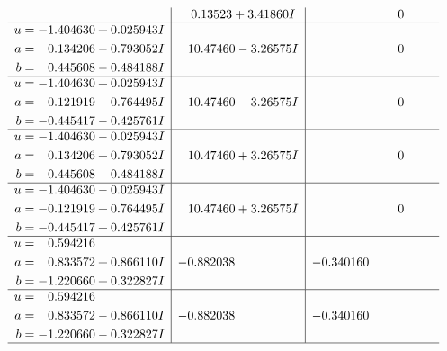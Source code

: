 \documentclass[1p]{elsarticle_modified}
\theoremstyle{definition}
\begin{document}
$$\begin{array}{c|c|c}
 & \phantom{-}0.13523 + 3.41860 I & \phantom{-0.000000 } 0 \\ \hline\begin{aligned}
u &= -1.404630 + 0.025943 I \\
a &= \phantom{-}0.134206 - 0.793052 I \\
b &= \phantom{-}0.445608 - 0.484188 I\end{aligned}
 & \phantom{-}10.47460 - 3.26575 I & \phantom{-0.000000 } 0 \\ \hline\begin{aligned}
u &= -1.404630 + 0.025943 I \\
a &= -0.121919 - 0.764495 I \\
b &= -0.445417 - 0.425761 I\end{aligned}
 & \phantom{-}10.47460 - 3.26575 I & \phantom{-0.000000 } 0 \\ \hline\begin{aligned}
u &= -1.404630 - 0.025943 I \\
a &= \phantom{-}0.134206 + 0.793052 I \\
b &= \phantom{-}0.445608 + 0.484188 I\end{aligned}
 & \phantom{-}10.47460 + 3.26575 I & \phantom{-0.000000 } 0 \\ \hline\begin{aligned}
u &= -1.404630 - 0.025943 I \\
a &= -0.121919 + 0.764495 I \\
b &= -0.445417 + 0.425761 I\end{aligned}
 & \phantom{-}10.47460 + 3.26575 I & \phantom{-0.000000 } 0 \\ \hline\begin{aligned}
u &= \phantom{-}0.594216\phantom{ +0.000000I} \\
a &= \phantom{-}0.833572 + 0.866110 I \\
b &= -1.220660 + 0.322827 I\end{aligned}
 & -0.882038\phantom{ +0.000000I} & -0.340160\phantom{ +0.000000I} \\ \hline\begin{aligned}
u &= \phantom{-}0.594216\phantom{ +0.000000I} \\
a &= \phantom{-}0.833572 - 0.866110 I \\
b &= -1.220660 - 0.322827 I\end{aligned}
 & -0.882038\phantom{ +0.000000I} & -0.340160\phantom{ +0.000000I}\\
 \hline 
 \end{array}$$\newpage$$\begin{array}{c|c|c}  

\end{array}$$
\end{document}
